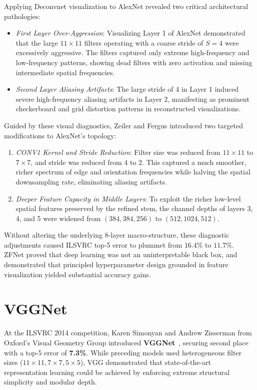 Applying Deconvnet visualization to AlexNet revealed two critical architectural pathologies:
\begin{itemize}[leftmargin=*]
  \item \textit{First Layer Over-Aggression}: Visualizing Layer 1 of AlexNet demonstrated that the large $11 \times 11$ filters operating with a coarse stride of $S=4$ were excessively aggressive. The filters captured only extreme high-frequency and low-frequency patterns, showing dead filters with zero activation and missing intermediate spatial frequencies.
  \item \textit{Second Layer Aliasing Artifacts}: The large stride of 4 in Layer 1 induced severe high-frequency aliasing artifacts in Layer 2, manifesting as prominent checkerboard and grid distortion patterns in reconstructed visualizations.
\end{itemize}

Guided by these visual diagnostics, Zeiler and Fergus introduced two targeted modifications to AlexNet's topology:
\begin{enumerate}[leftmargin=*]
  \item \textit{CONV1 Kernel and Stride Reduction}: Filter size was reduced from $11 \times 11$ to \textbf{$7 \times 7$}, and stride was reduced from $4$ to \textbf{$2$}. This captured a much smoother, richer spectrum of edge and orientation frequencies while halving the spatial downsampling rate, eliminating aliasing artifacts.
  \item \textit{Deeper Feature Capacity in Middle Layers}: To exploit the richer low-level spatial features preserved by the refined stem, the channel depths of layers 3, 4, and 5 were widened from $(384, 384, 256)$ to \textbf{$(512, 1024, 512)$}.
\end{enumerate}

Without altering the underlying 8-layer macro-structure, these diagnostic adjustments caused ILSVRC top-5 error to plummet from $16.4\%$ to $11.7\%$. ZFNet proved that deep learning was not an uninterpretable black box, and demonstrated that principled hyperparameter design grounded in feature visualization yielded substantial accuracy gains.

\section{VGGNet}
\label{sec:vggnet_model}

At the ILSVRC 2014 competition, Karen Simonyan and Andrew Zisserman from Oxford's Visual Geometry Group introduced \textbf{VGGNet}~\cite{simonyan2014very}, securing second place with a top-5 error of \textbf{7.3\%}. While preceding models used heterogeneous filter sizes ($11 \times 11, 7 \times 7, 5 \times 5$), VGG demonstrated that state-of-the-art representation learning could be achieved by enforcing extreme structural simplicity and modular depth.


